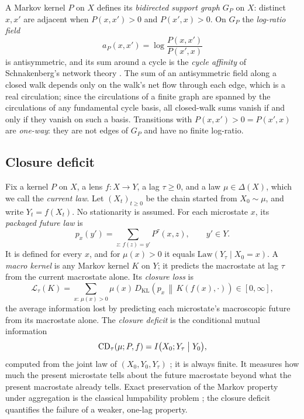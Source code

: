 \documentclass[11pt]{article}
\theoremstyle{definition}
\newcommand{\1}{\mathbf{1}}
\newcommand{\DKL}[2]{D_{\mathrm{KL}}\!\left(#1\,\middle\|\,#2\right)}
\newcommand{\Law}{\mathrm{Law}}
\begin{document}
A Markov kernel $P$ on $X$ defines its \emph{bidirected support graph} $G_P$ on $X$: distinct $x,x'$ are adjacent when $P(x,x')>0$ and $P(x',x)>0$.
On $G_P$ the \emph{log-ratio field}
\[
  a_P(x,x')=\log\frac{P(x,x')}{P(x',x)}
\]
is antisymmetric, and its sum around a cycle is the \emph{cycle affinity} of Schnakenberg's network theory \citep{Schnakenberg1976}.
The sum of an antisymmetric field along a closed walk depends only on the walk's net flow through each edge, which is a real circulation; since the circulations of a finite graph are spanned by the circulations of any fundamental cycle basis, all closed-walk sums vanish if and only if they vanish on such a basis.
Transitions with $P(x,x')>0=P(x',x)$ are \emph{one-way}: they are not edges of $G_P$ and have no finite log-ratio.

\subsection{Closure deficit}
Fix a kernel $P$ on $X$, a lens $f:X\to Y$, a lag $\tau\ge 0$, and a law $\mu\in\Delta(X)$, which we call the \emph{current law}.
Let $(X_t)_{t\ge 0}$ be the chain started from $X_0\sim\mu$, and write $Y_t=f(X_t)$.
No stationarity is assumed.
For each microstate $x$, its \emph{packaged future law} is
\[
  p_x(y')=\sum_{z:\,f(z)=y'}P^{\tau}(x,z),\qquad y'\in Y.
\]
It is defined for every $x$, and for $\mu(x)>0$ it equals $\Law(Y_\tau\mid X_0=x)$.
A \emph{macro kernel} is any Markov kernel $K$ on $Y$; it predicts the macrostate at lag $\tau$ from the current macrostate alone.
Its \emph{closure loss} is
\[
  \mathcal{L}_\tau(K)=\sum_{x:\,\mu(x)>0}\mu(x)\,\DKL{p_x}{K(f(x),\cdot)}\in[0,\infty],
\]
the average information lost by predicting each microstate's macroscopic future from its macrostate alone.
The \emph{closure deficit} is the conditional mutual information
\[
  \mathrm{CD}_\tau(\mu;P,f)=I\bigl(X_0;Y_\tau\bigm| Y_0\bigr),
\]
computed from the joint law of $(X_0,Y_0,Y_\tau)$ \citep{CoverThomas2006}; it is always finite.
It measures how much the present microstate tells about the future macrostate beyond what the present macrostate already tells.
Exact preservation of the Markov property under aggregation is the classical lumpability problem \citep{KemenySnell1960,Buchholz1994}; the closure deficit quantifies the failure of a weaker, one-lag property.
\end{document}
